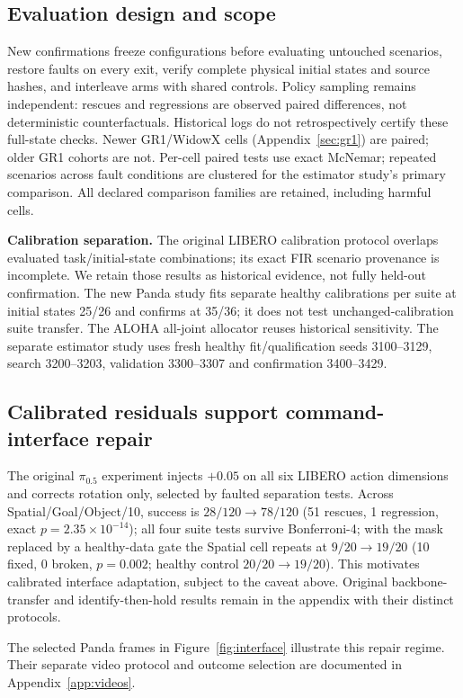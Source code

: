 \documentclass{article}
\begin{document}
\subsection{Evaluation design and scope}
New confirmations freeze configurations before evaluating untouched scenarios, restore
faults on every exit, verify complete physical initial states and source hashes, and
interleave arms with shared controls. Policy sampling remains independent: rescues and
regressions are observed paired differences, not deterministic counterfactuals. Historical
logs do not retrospectively certify these full-state checks. Newer GR1/WidowX cells (Appendix~\ref{sec:gr1}) are paired; older GR1 cohorts are not.
Per-cell paired tests use exact McNemar; repeated scenarios across fault conditions are
clustered for the estimator study's primary comparison. All declared comparison families
are retained, including harmful cells.

\textbf{Calibration separation.} The original LIBERO calibration protocol overlaps evaluated
task/initial-state combinations; its exact FIR scenario provenance is incomplete. We retain
those results as historical evidence, not fully held-out confirmation. The new Panda study
fits separate healthy calibrations per suite at initial states 25/26 and confirms at 35/36;
it does not test unchanged-calibration suite transfer. The ALOHA all-joint allocator reuses
historical sensitivity. The separate estimator study uses fresh healthy fit/qualification
seeds 3100--3129, search 3200--3203, validation 3300--3307 and confirmation 3400--3429.

\subsection{Calibrated residuals support command-interface repair}
The original $\pi_{0.5}$ experiment injects $+0.05$ on all six LIBERO action dimensions and
corrects rotation only, selected by faulted separation tests. Across Spatial/Goal/Object/10,
success is $28/120\to78/120$ (51 rescues, 1 regression, exact $p=2.35\times10^{-14}$);
all four suite tests survive Bonferroni-4; with the mask replaced by a healthy-data gate the
Spatial cell repeats at $9/20\to19/20$ (10 fixed, 0 broken, $p=0.002$; healthy control
$20/20\to19/20$). This motivates calibrated interface adaptation, subject to the caveat above. Original backbone-transfer and identify-then-hold
results remain in the appendix with their distinct protocols.

The selected Panda frames in Figure~\ref{fig:interface} illustrate this repair regime.
Their separate video protocol and outcome selection are documented in Appendix~\ref{app:videos}.
\end{document}
